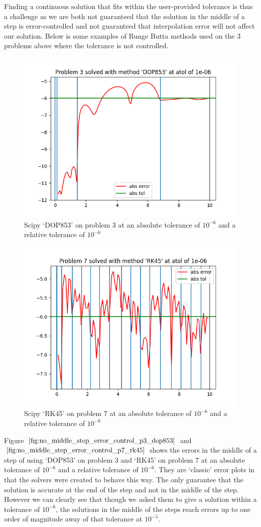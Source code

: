 \documentclass{article}
\begin{document}
Finding a continuous solution that fits within the user-provided tolerance is thus a challenge as we are both not guaranteed that the solution in the middle of a step is error-controlled and not guaranteed that interpolation error will not affect our solution. Below is some examples of Runge Butta methods used on the 3 problems above where the tolerance is not controlled.

\begin{figure}[H]
\centering
\includegraphics[width=0.7\linewidth]{./figures/no_middle_step_error_control_p3_dop853}
\caption{Scipy `DOP853' on problem 3 at an absolute tolerance of $10^{-6}$ and a relative tolerance of $10^{-6}$}
\label{fig:no_middle_step_error_control_p3_dop853}
\end{figure}

\begin{figure}[H]
\centering
\includegraphics[width=0.7\linewidth]{./figures/no_middle_step_error_control_p7_rk45}
\caption{Scipy `RK45' on problem 7 at an absolute tolerance of $10^{-6}$ and a relative tolerance of $10^{-6}$}
\label{fig:no_middle_step_error_control_p7_rk45}
\end{figure}

Figure $\ref{fig:no_middle_step_error_control_p3_dop853}$ and $\ref{fig:no_middle_step_error_control_p7_rk45}$ shows the errors in the middle of a step of using `DOP853' on problem 3 and `RK45' on problem 7 at an absolute tolerance of $10^{-6}$ and a relative tolerance of $10^{-6}$. They are `classic' error plots in that the solvers were created to behave this way. The only guarantee that the solution is accurate at the end of the step and not in the middle of the step. However we can clearly see that though we asked them to give a solution within a tolerance of $10^{-6}$, the solutions in the middle of the steps reach errors up to one order of magnitude away of that tolerance at $10^{-5}$. 
\end{document}
